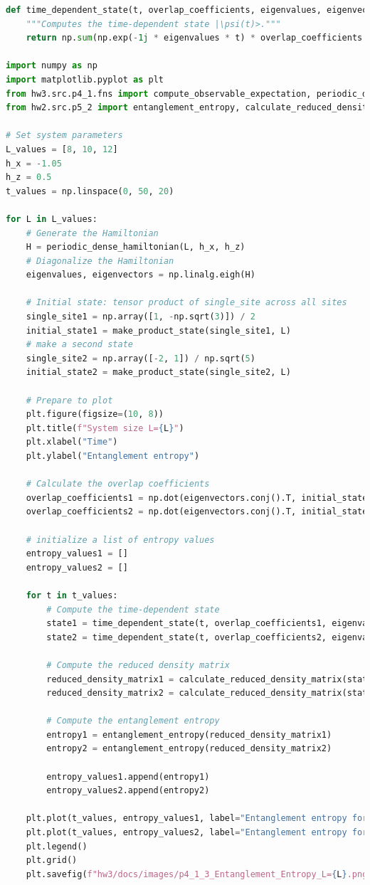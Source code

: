 \documentclass[12pt]{article}
\begin{document}
\begin{lstlisting}[language=Python]
def time_dependent_state(t, overlap_coefficients, eigenvalues, eigenvectors):
    """Computes the time-dependent state |\psi(t)>."""
    return np.sum(np.exp(-1j * eigenvalues * t) * overlap_coefficients * eigenvectors, axis=1)

import numpy as np
import matplotlib.pyplot as plt
from hw3.src.p4_1.fns import compute_observable_expectation, periodic_dense_hamiltonian, make_product_state, time_dependent_state
from hw2.src.p5_2 import entanglement_entropy, calculate_reduced_density_matrix

# Set system parameters
L_values = [8, 10, 12]
h_x = -1.05
h_z = 0.5
t_values = np.linspace(0, 50, 20)

for L in L_values:
    # Generate the Hamiltonian
    H = periodic_dense_hamiltonian(L, h_x, h_z)
    # Diagonalize the Hamiltonian
    eigenvalues, eigenvectors = np.linalg.eigh(H)

    # Initial state: tensor product of single_site across all sites
    single_site1 = np.array([1, -np.sqrt(3)]) / 2
    initial_state1 = make_product_state(single_site1, L)
    # make a second state
    single_site2 = np.array([-2, 1]) / np.sqrt(5)
    initial_state2 = make_product_state(single_site2, L)

    # Prepare to plot
    plt.figure(figsize=(10, 8))
    plt.title(f"System size L={L}")
    plt.xlabel("Time")
    plt.ylabel("Entanglement entropy")

    # Calculate the overlap coefficients
    overlap_coefficients1 = np.dot(eigenvectors.conj().T, initial_state1)
    overlap_coefficients2 = np.dot(eigenvectors.conj().T, initial_state2)

    # initialize a list of entropy values
    entropy_values1 = []
    entropy_values2 = []

    for t in t_values:
        # Compute the time-dependent state
        state1 = time_dependent_state(t, overlap_coefficients1, eigenvalues, eigenvectors)
        state2 = time_dependent_state(t, overlap_coefficients2, eigenvalues, eigenvectors)

        # Compute the reduced density matrix
        reduced_density_matrix1 = calculate_reduced_density_matrix(state1, L, L // 2)
        reduced_density_matrix2 = calculate_reduced_density_matrix(state2, L,  L // 2)

        # Compute the entanglement entropy
        entropy1 = entanglement_entropy(reduced_density_matrix1)
        entropy2 = entanglement_entropy(reduced_density_matrix2)
        
        entropy_values1.append(entropy1)
        entropy_values2.append(entropy2)
        
    plt.plot(t_values, entropy_values1, label="Entanglement entropy for state 1")
    plt.plot(t_values, entropy_values2, label="Entanglement entropy for state 2")
    plt.legend()
    plt.grid()
    plt.savefig(f"hw3/docs/images/p4_1_3_Entanglement_Entropy_L={L}.png")


    
\end{lstlisting}
\newpage
\end{document}
